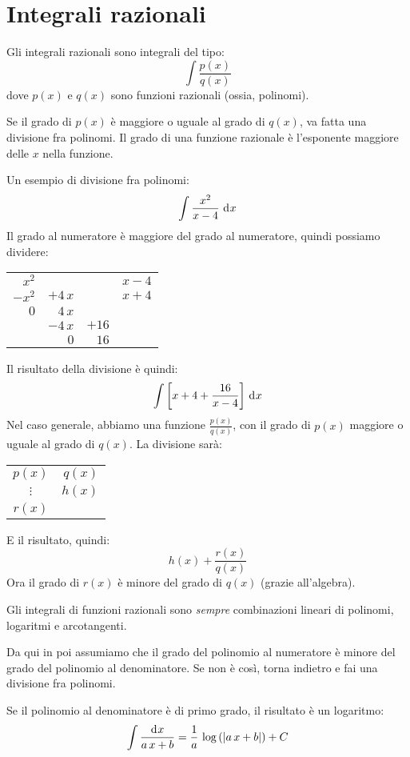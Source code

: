 \section{Integrali razionali}

Gli integrali razionali sono integrali del tipo:
\[
\int \frac{p(x)}{q(x)}
\]
dove $p(x)$ e $q(x)$ sono funzioni razionali (ossia, polinomi).

Se il grado di $p(x)$ \`e maggiore o uguale al grado di $q(x)$,
va fatta una divisione fra polinomi. Il grado di una funzione 
razionale \`e l'esponente maggiore delle $x$ nella funzione.

Un esempio di divisione fra polinomi:
\[
\int \frac{x^2}{x - 4} \dx
\]
Il grado al numeratore \`e maggiore del grado al numeratore, quindi
possiamo dividere:
\begin{center}
\begin{tabular}{rrr|r}
$x^2$ & & & $x - 4$ \\ \cline{4-4}
$-x^2$ & $+4 \, x$ & & $x + 4$ \\ \cline{1-2}
$0$ & $4 \, x$ & & \\
& $- 4 \, x$ & $+ 16$ & \\ \cline{2-3}
& $0$ & $16$ & 
\end{tabular}
\end{center}
Il risultato della divisione \`e quindi:
\[
\int \left[ x + 4 + \frac{16}{x-4} \right] \dx 
\]
Nel caso generale, abbiamo una funzione $\frac{p(x)}{q(x)}$, con il grado 
di $p(x)$ maggiore o uguale al grado di $q(x)$. La divisione sar\`a:
\begin{center}
\begin{tabular}{c|r}
$p(x)$ & $q(x)$ \\ \cline{2-2}
$\vdots$ & $h(x)$ \\ \cline{1-1}
$r(x)$ & 
\end{tabular}
\end{center}
E il risultato, quindi:
\[
h(x) + \frac{r(x)}{q(x)}
\]
Ora il grado di $r(x)$ \`e minore del grado di $q(x)$ (grazie all'algebra).

Gli integrali di funzioni razionali sono \emph{sempre} combinazioni 
lineari di polinomi, logaritmi e arcotangenti.

Da qui in poi assumiamo che il grado del polinomio al numeratore \`e 
minore del grado del polinomio al denominatore. Se non \`e cos\`i, torna 
indietro e fai una divisione fra polinomi.

Se il polinomio al denominatore \`e di primo grado, il risultato \`e un 
logaritmo:
\[
\int \frac{\diff x}{a \, x + b} =
\frac{1}{a} \, \abslog{a \, x + b} + C
\]


